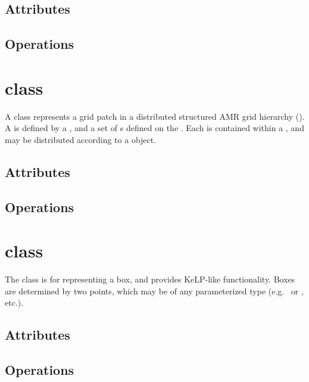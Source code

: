 \subsection{Attributes}

\subsection{Operations}

\section{ class}

A  class represents a grid patch in a distributed structured
AMR grid hierarchy ().  A  is defined by a
, and a set of s defined on the .  Each
 is contained within a , and may be distributed
according to a  object.

\subsection{Attributes}

\subsection{Operations}

\section{ class}

The  class is for representing a box, and provides KeLP-like functionality.
Boxes are determined by two points, which may be of any parameterized type
(e.g.~ or , etc.).


\subsection{Attributes}

\subsection{Operations}

